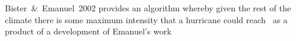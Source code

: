 Bister~\&~Emanuel~2002 provides an algorithm whereby given the rest of the climate
there is some maximum intensity that a hurricane could reach~\cite{bister2002low}
as a product of a development of Emanuel's work~\cite{bister1996development,bister1998dissipative, bister2002low}
